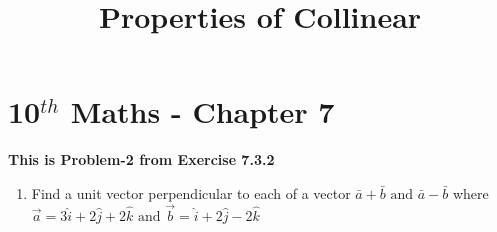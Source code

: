\documentclass[journal,10pt,twocolumn]{article}
\begin{document}
\begin{center}
\title{\textbf{Properties of Collinear}}
\date{\vspace{-5ex}} %
\maketitle
\end{center}
\setcounter{page}{1}
\section{10$^{th}$ Maths - Chapter 7}
\textbf{This is Problem-2 from Exercise 7.3.2}
\begin{enumerate}

\item Find a unit vector  perpendicular to each of a vector $\bar{a}+\bar{b} \text{ and }\bar{a}-\bar{b}$ where  $\overrightarrow{a}=3\hat{i}+2\hat{j}+2\hat{k}\text{ and }\overrightarrow{b}=\hat{i}+2\hat{j}-2\hat{k}$

\end{enumerate}
\end{document}
